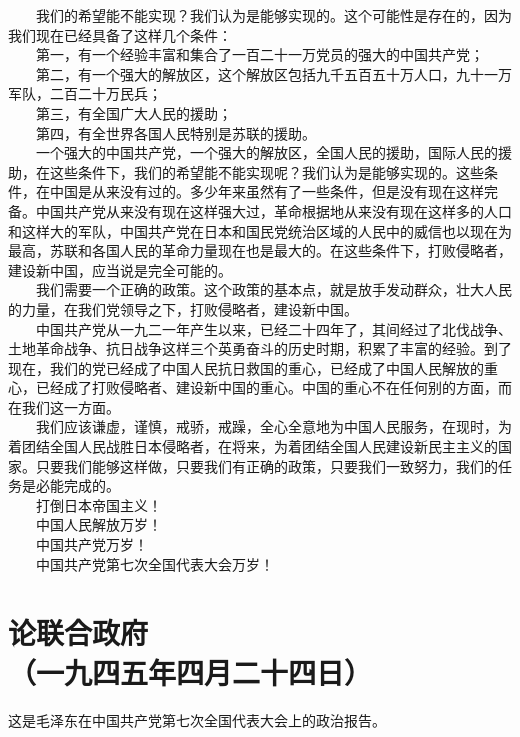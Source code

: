 \documentclass[cn,11pt,chinese]{elegantbook}
\def\myformat#1{\hfil\hfil #1}
\begin{document}
　　我们的希望能不能实现？我们认为是能够实现的。这个可能性是存在的，因为我们现在已经具备了这样几个条件：\\
　　第一，有一个经验丰富和集合了一百二十一万党员的强大的中国共产党；\\
　　第二，有一个强大的解放区，这个解放区包括九千五百五十万人口，九十一万军队，二百二十万民兵；\\
　　第三，有全国广大人民的援助；\\
　　第四，有全世界各国人民特别是苏联的援助。\\
　　一个强大的中国共产党，一个强大的解放区，全国人民的援助，国际人民的援助，在这些条件下，我们的希望能不能实现呢？我们认为是能够实现的。这些条件，在中国是从来没有过的。多少年来虽然有了一些条件，但是没有现在这样完备。中国共产党从来没有现在这样强大过，革命根据地从来没有现在这样多的人口和这样大的军队，中国共产党在日本和国民党统治区域的人民中的威信也以现在为最高，苏联和各国人民的革命力量现在也是最大的。在这些条件下，打败侵略者，建设新中国，应当说是完全可能的。\\
　　我们需要一个正确的政策。这个政策的基本点，就是放手发动群众，壮大人民的力量，在我们党领导之下，打败侵略者，建设新中国。\\
　　中国共产党从一九二一年产生以来，已经二十四年了，其间经过了北伐战争、土地革命战争、抗日战争这样三个英勇奋斗的历史时期，积累了丰富的经验。到了现在，我们的党已经成了中国人民抗日救国的重心，已经成了中国人民解放的重心，已经成了打败侵略者、建设新中国的重心。中国的重心不在任何别的方面，而在我们这一方面。\\
　　我们应该谦虚，谨慎，戒骄，戒躁，全心全意地为中国人民服务，在现时，为着团结全国人民战胜日本侵略者，在将来，为着团结全国人民建设新民主主义的国家。只要我们能够这样做，只要我们有正确的政策，只要我们一致努力，我们的任务是必能完成的。\\
　　打倒日本帝国主义！\\
　　中国人民解放万岁！\\
　　中国共产党万岁！\\
　　中国共产党第七次全国代表大会万岁！\\
\newpage\section*{\myformat{论联合政府}\\\myformat{（一九四五年四月二十四日）}}
\begin{introduction}\item  这是毛泽东在中国共产党第七次全国代表大会上的政治报告。\end{introduction}
\end{document}
